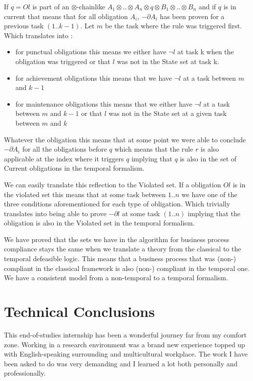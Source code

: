 \documentclass[10pt]{report}
\newcommand{\ochain}{$\otimes$-chain}
\begin{document}
If $q=Ol$ is part of an \ochain like $A_{1}\otimes .. \otimes A_{n} \otimes q \otimes B_{1} \otimes .. \otimes B_{n}$ and if $q$ is in current that means that for all obligation $A_{i}$, $-\partial A_{i}$ has been proven for a previous task $(1..k-1)$. Let $m$ be the task where the rule was triggered first. Which translates into :
\begin{itemize}
\item for punctual obligations this means we either have $\neg l$ at task k when the obligation was triggered or that $l$ was not in the State set at task k.
\item for achievement obligations this means that we have $\neg l$ at a task between $m$ and $k-1$
\item for maintenance obligations this means that we either have $\neg l$ at a task between $m$ and $k-1$ or that $l$ was not in the State set at a given task between $m$ and $k$ 
\end{itemize}

Whatever the obligation this means that at some point we were able to conclude $-\partial A_{i}$ for all the obligations before $q$ which means that the rule $r$ is also applicable at the index where it triggers $q$ implying that $q$ is also in the set of Current obligations in the temporal formalism.

We can easily translate this reflection to the Violated set. If a obligation $Ol$ is in the violated set this means that at some task between $1..n$ we have one of the three conditions aforementioned for each type of obligation. Which trivially translates into being able to prove $-\partial l$ at some task $(1..n)$ implying that the obligation is also in the Violated set in the temporal formalism.

We have proved that the sets we have in the algorithm for business process compliance stays the same when we translate a theory from the classical to the temporal defeasible logic. This means that a business process that was (non-) compliant in the classical framework is also (non-) compliant in the temporal one. We have a consistent model from a non-temporal to a temporal formalism.

\section*{Technical Conclusions}
This end-of-studies internship has been a wonderful journey far from my comfort zone. Working in a research environment was a brand new experience topped up with English-speaking surrounding and multicultural workplace. The work I have been asked to do was very demanding and I learned a lot both personally and professionally.
\end{document}

